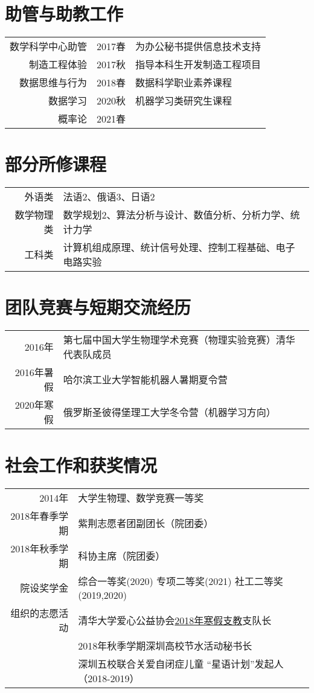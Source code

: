 \documentclass[12pt]{moderncv}
\begin{document}
\section{助管与助教工作}
\begin{tabular}{rll}
    数学科学中心助管 & 2017春 & 为办公秘书提供信息技术支持 \\
    制造工程体验   & 2017秋 & 指导本科生开发制造工程项目\\
    数据思维与行为 & 2018春 & 数据科学职业素养课程\\
    数据学习 &  2020秋 & 机器学习类研究生课程 \\
    概率论 &   2021春 & 
\end{tabular}
\section{部分所修课程}
\begin{tabular}{rl}
    外语类 & 法语2、俄语3、日语2 \\
    数学物理类 & 数学规划2、算法分析与设计、数值分析、分析力学、统计力学\\
    工科类 & 计算机组成原理、统计信号处理、控制工程基础、电子电路实验
\end{tabular}
\section{团队竞赛与短期交流经历}
\begin{tabular}{rl}
    2016年 & 第七届中国大学生物理学术竞赛（物理实验竞赛）清华代表队成员\\
    2016年暑假 & 哈尔滨工业大学智能机器人暑期夏令营 \\
    2020年寒假 & 俄罗斯圣彼得堡理工大学冬令营（机器学习方向）
\end{tabular}

\section{社会工作和获奖情况}

\begin{tabular}{rl}
2014年 & 大学生物理、数学竞赛一等奖 \\
2018年春季学期  & 紫荆志愿者团副团长（院团委）\\
2018年秋季学期 & 科协主席（院团委） \\
院设奖学金 & 综合一等奖(2020) 专项二等奖(2021) 社工二等奖 (2019,2020)\\
组织的志愿活动 & 清华大学爱心公益协会\href{http://leidenschaft.cn/volunteer0}{2018年寒假支教}支队长 \\
& 2018年秋季学期深圳高校节水活动秘书长 \\
& 深圳五校联合关爱自闭症儿童 “星语计划”发起人（2018-2019）
\end{tabular}
\end{document}

